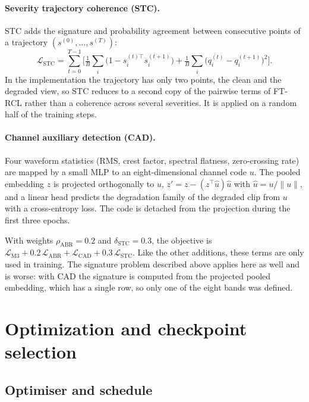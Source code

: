 \paragraph{Severity trajectory coherence (STC).} STC adds the signature and probability agreement between consecutive points of a trajectory $(s^{(0)},\ldots,s^{(T)})$:
\begin{equation}
\mathcal{L}_{\mathrm{STC}} = \sum_{t=0}^{T-1}\Big[\tfrac{1}{B}\sum_i\big(1-s^{(t)\top}_i s^{(t+1)}_i\big) + \tfrac{1}{B}\sum_i\big(q^{(t)}_i-q^{(t+1)}_i\big)^2\Big].
\label{eq:stc}
\end{equation}
In the implementation the trajectory has only two points, the clean and the degraded view, so STC reduces to a second copy of the pairwise terms of FT-RCL rather than a coherence across several severities. It is applied on a random half of the training steps.

\paragraph{Channel auxiliary detection (CAD).} Four waveform statistics (RMS, crest factor, spectral flatness, zero-crossing rate) are mapped by a small MLP to an eight-dimensional channel code $u$. The pooled embedding $z$ is projected orthogonally to $u$, $z'=z-(z^\top\hat u)\hat u$ with $\hat u=u/\lVert u\rVert$, and a linear head predicts the degradation family of the degraded clip from $u$ with a cross-entropy loss. The code is detached from the projection during the first three epochs.

With weights $\rho_{\mathrm{ABR}}=0.2$ and $\delta_{\mathrm{STC}}=0.3$, the objective is $\mathcal{L}_{\mathrm{M3}}+0.2\,\mathcal{L}_{\mathrm{ABR}}+\mathcal{L}_{\mathrm{CAD}}+0.3\,\mathcal{L}_{\mathrm{STC}}$. Like the other additions, these terms are only used in training. The signature problem described above applies here as well and is worse: with CAD the signature is computed from the projected pooled embedding, which has a single row, so only one of the eight bands was defined.

\section{Optimization and checkpoint selection}
\label{sec:optimization}

\subsection{Optimiser and schedule}


